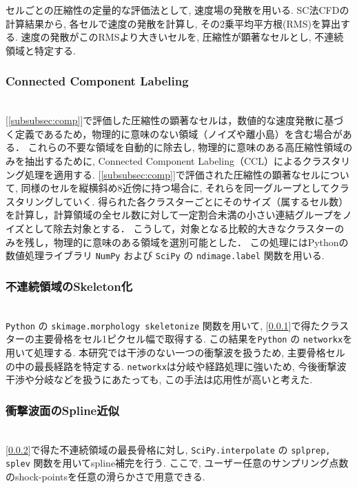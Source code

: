 \documentclass[a4j]{jarticle}
\begin{document}
セルごとの圧縮性の定量的な評価法として, 速度場の発散を用いる.
SC法CFDの計算結果から, 各セルで速度の発散を計算し, その2乗平均平方根(RMS)を算出する.
速度の発散がこのRMSより大きいセルを, 圧縮性が顕著なセルとし, 不連続領域と特定する.

\subsubsection{Connected Component Labeling}\label{subsubsec:CCL}
\mbox{}\\[-1.0ex]

[\ref{subsubsec:comp}]で評価した圧縮性の顕著なセルは，数値的な速度発散に基づく定義であるため，物理的に意味のない領域（ノイズや離小島）を含む場合がある．
これらの不要な領域を自動的に除去し, 物理的に意味のある高圧縮性領域のみを抽出するために, Connected Component Labeling（CCL）によるクラスタリング処理を適用する.
[\ref{subsubsec:comp}]で評価された圧縮性の顕著なセルについて, 同様のセルを縦横斜め8近傍に持つ場合に, それらを同一グループとしてクラスタリングしていく.
得られた各クラスターごとにそのサイズ（属するセル数）を計算し，計算領域の全セル数に対して一定割合未満の小さい連結グループをノイズとして除去対象とする．
こうして，対象となる比較的大きなクラスターのみを残し，物理的に意味のある領域を選別可能とした．
この処理にはPythonの数値処理ライブラリ \texttt{NumPy} および \texttt{SciPy} の \texttt{ndimage.label} 関数を用いる.

\subsubsection{不連続領域のSkeleton化} \label{subsubsec:skeleton}
\mbox{}\\[-1.0ex]

\texttt{Python} の \texttt{skimage.morphology skeletonize} 関数を用いて, [\ref{subsubsec:CCL}]で得たクラスターの主要骨格をセル1ピクセル幅で取得する.
この結果を\texttt{Python} の \texttt{networkx}を用いて処理する.
本研究では干渉のない一つの衝撃波を扱うため, 主要骨格セルの中の最長経路を特定する.
\texttt{networkx}は分岐や経路処理に強いため,
今後衝撃波干渉や分岐などを扱うにあたっても, この手法は応用性が高いと考えた.

\subsubsection{衝撃波面のSpline近似} \label{subsubsec:spline}
\mbox{}\\[-1.0ex]

[\ref{subsubsec:skeleton}]で得た不連続領域の最長骨格に対し, 
\texttt{SciPy.interpolate} の \texttt{splprep, splev} 関数を用いてspline補完を行う.
ここで, ユーザー任意のサンプリング点数のshock-pointsを任意の滑らかさで用意できる.
\end{document}
